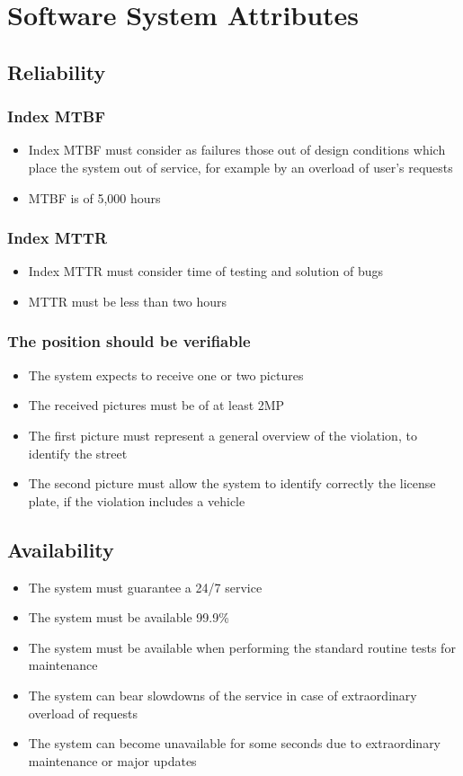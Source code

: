 \section{Software System Attributes}

\subsection{Reliability}
\subsubsection{Index MTBF}
\begin{itemize}
    \item Index MTBF must consider as failures those out of design conditions which place the system out of service, for example by an overload of user’s requests
    \item MTBF is of 5,000 hours
\end{itemize}

\subsubsection{Index MTTR}
\begin{itemize}
    \item Index MTTR must consider time of testing and solution of bugs
    \item MTTR must be less than two hours
\end{itemize}

\subsubsection{The position should be verifiable}
\begin{itemize}
    \item The system expects to receive one or two pictures
    \item The received pictures must be of at least 2MP
    \item The first picture must represent a general overview of the violation, to identify the street
    \item The second picture must allow the system to identify correctly the license plate, if the violation includes a vehicle
\end{itemize}

\subsection{Availability}
\begin{itemize}
    \item The system must guarantee a 24/7 service
    \item The system must be available 99.9\%
    \item The system must be available when performing the standard routine tests for maintenance
    \item The system can bear slowdowns of the service in case of extraordinary overload of requests
    \item The system can become unavailable for some seconds due to extraordinary maintenance or major updates
\end{itemize}

